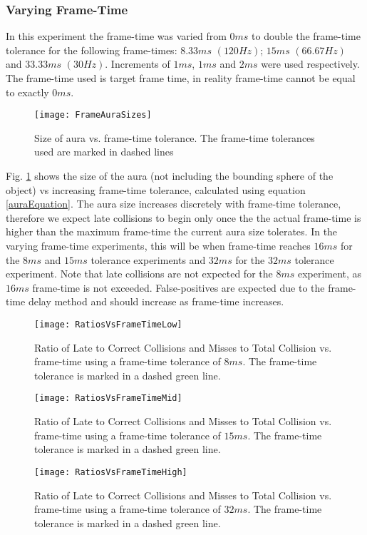 \subsubsection{Varying Frame-Time}

In this experiment the frame-time was varied from $0ms$ to double the frame-time tolerance for the following frame-times: $8.33ms$ $(120Hz)$; $15ms$ $(66.67Hz)$ and $33.33ms$ $(30Hz)$. Increments of $1ms$, $1ms$ and $2ms$ were used respectively. The frame-time used is target frame time, in reality frame-time cannot be equal to exactly $0ms$.

\begin{figure}
	\centering
	\texttt{[image: FrameAuraSizes]}
	\caption{Size of aura vs. frame-time tolerance. The frame-time tolerances used are marked in dashed lines}
	\label{fig_FrameTimeAuraSize}
\end{figure}

Fig. \ref{fig_FrameTimeAuraSize} shows the size of the aura (not including the bounding sphere of the object) vs increasing frame-time tolerance, calculated using equation \ref{auraEquation}. The aura size increases discretely with frame-time tolerance, therefore we expect late collisions to begin only once the the actual frame-time is higher than the maximum frame-time the current aura size tolerates. In the varying frame-time experiments, this will be when frame-time reaches $16ms$ for the $8ms$ and $15ms$ tolerance experiments and $32ms$ for the $32ms$ tolerance experiment. Note that late collisions are not expected for the $8ms$ experiment, as $16ms$ frame-time is not exceeded. False-positives are expected due to the frame-time delay method and should increase as frame-time increases.

\begin{figure}
	\centering
	\texttt{[image: RatiosVsFrameTimeLow]}
	\caption{Ratio of Late to Correct Collisions and Misses to Total Collision vs. frame-time using a frame-time tolerance of $8ms$. The frame-time tolerance is marked in a dashed green line.}
	\label{fig_RatioVsFrameTimeLow}
\end{figure}
\begin{figure}
	\centering
	\texttt{[image: RatiosVsFrameTimeMid]}
	\caption{Ratio of Late to Correct Collisions and Misses to Total Collision vs. frame-time using a frame-time tolerance of $15ms$. The frame-time tolerance is marked in a dashed green line.}
	\label{fig_RatioVsFrameTimeMid}
\end{figure}
\begin{figure}
	\centering
	\texttt{[image: RatiosVsFrameTimeHigh]}
	\caption{Ratio of Late to Correct Collisions and Misses to Total Collision vs. frame-time using a frame-time tolerance of $32ms$. The frame-time tolerance is marked in a dashed green line.}
	\label{fig_RatioVsFrameTimeHigh}
\end{figure}

